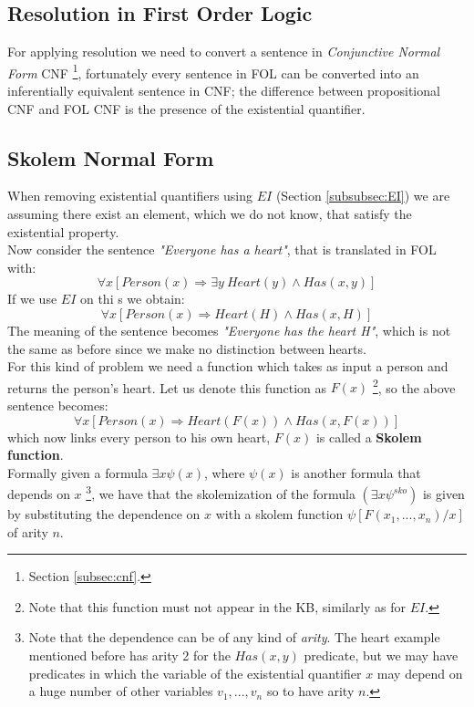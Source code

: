 \documentclass[10pt,a4paper]{article}
\begin{document}
\begin{itemize}
\newpage
\section{Resolution in First Order Logic}
For applying resolution we need to convert a sentence in \textit{Conjunctive Normal Form} CNF \footnote{Section \ref{subsec:cnf}.}, fortunately every sentence in FOL can be converted into an inferentially equivalent sentence in CNF; the difference between propositional CNF and FOL CNF is the presence of the existential quantifier.


\subsection{Skolem Normal Form}
\label{sec:skolemNF}
When removing existential quantifiers using $EI$ (Section \ref{subsubsec:EI}) we are assuming there exist an element, which we do not know, that satisfy the existential property.\\
Now consider the sentence \textit{"Everyone has a heart"}, that is translated in FOL with:
\[\forall x [Person(x)\Rightarrow \exists y\ Heart(y)\wedge Has(x,y)]\]
If we use $EI$ on thi s we obtain:
\[\forall x [Person(x)\Rightarrow  Heart(H)\wedge Has(x,H)]\]
The meaning of the sentence becomes \textit{"Everyone has the heart H"}, which is not the same as before since we make no distinction between hearts.\\
For this kind of problem we need a function which takes as input a person and returns the person's heart. Let us denote this function as $F(x)$ \footnote{Note that this function must not appear in the KB, similarly as for $EI$.}, so the above sentence becomes:
\[\forall x [Person(x)\Rightarrow  Heart(F(x))\wedge Has(x,F(x))]\]
which now links every person to his own heart, $F(x)$ is called a \textbf{Skolem function}.\\
Formally given a formula $\exists x\psi(x)$, where $\psi(x)$ is another formula that depends on $x$ \footnote{Note that the dependence can be of any kind of \textit{arity}. The heart example mentioned before has arity 2 for the $Has(x,y)$ predicate, but we may have predicates in which the variable of the existential quantifier $x$ may depend on a huge number of other variables $v_1,...,v_n$ so to have arity $n$.}, we have that the skolemization of the formula $(\exists x\psi^{sko})$ is given by substituting the dependence on $x$ with a skolem function $\psi[F(x_1,...,x_n)/x]$ of arity $n$.


\end{itemize}
\end{document}
